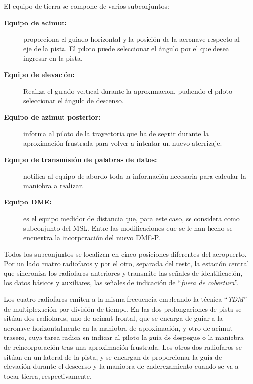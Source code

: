 El equipo de tierra se compone de varios subconjuntos:

\begin{description}
\item [\bf Equipo de acimut:] proporciona el guiado horizontal y la posición
  de la aeronave respecto al eje de la pista. El piloto puede
  seleccionar el ángulo por el que desea ingresar en la pista.

\item [\bf Equipo de elevación:] Realiza el guiado vertical durante la aproximación, pudiendo el piloto
seleccionar el ángulo de descenso.

\item [\bf Equipo de azimut posterior:] informa al piloto de la trayectoria que ha de seguir durante la
aproximación frustrada para volver a intentar un nuevo aterrizaje.

\item [\bf Equipo de transmisión de palabras de datos:] notifica al equipo de abordo toda la información necesaria para calcular la maniobra a realizar.

\item [\bf Equipo DME:] es el equipo medidor de distancia que, para este caso, se considera como
subconjunto del MSL. Entre las modificaciones que se le han hecho se encuentra la incorporación
del nuevo DME-P.

\end{description}

Todos los subconjuntos se localizan en cinco posiciones diferentes del aeropuerto. Por un lado
cuatro radiofaros y por el otro, separada del resto, la estación central que sincroniza los radiofaros
anteriores y transmite las señales de identificación, los datos básicos y auxiliares, las señales de
indicación de ``\emph{fuera de cobertura}''.

Los cuatro radiofaros emiten a la misma frecuencia empleando la técnica ``\emph{TDM}'' de multiplexación por división de tiempo. En las dos prolongaciones de pista se sitúan dos radiofaros, uno
de acimut frontal, que se encarga de guiar a la aeronave horizontalmente en la maniobra de aproximación, y otro de acimut trasero, cuya tarea radica en indicar al piloto la guía de despegue o la
maniobra de reincorporación tras una aproximación frustrada. Los otros dos radiofaros se sitúan en
un lateral de la pista, y se encargan de proporcionar la guía de elevación durante el descenso y la
maniobra de enderezamiento cuando se va a tocar tierra, respectivamente.

